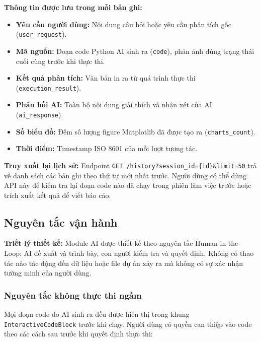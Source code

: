 \noindent\textbf{Thông tin được lưu trong mỗi bản ghi:}
\begin{itemize}
    \item \textbf{Yêu cầu người dùng:} Nội dung câu hỏi hoặc yêu cầu phân tích gốc (\texttt{user\_request}).
    \item \textbf{Mã nguồn:} Đoạn code Python AI sinh ra (\texttt{code}), phản ánh đúng trạng thái cuối cùng trước khi thực thi.
    \item \textbf{Kết quả phân tích:} Văn bản in ra từ quá trình thực thi (\texttt{execution\_result}).
    \item \textbf{Phản hồi AI:} Toàn bộ nội dung giải thích và nhận xét của AI (\texttt{ai\_response}).
    \item \textbf{Số biểu đồ:} Đếm số lượng figure Matplotlib đã được tạo ra (\texttt{charts\_count}).
    \item \textbf{Thời điểm:} Timestamp ISO 8601 của mỗi lượt tương tác.
\end{itemize}

\noindent\textbf{Truy xuất lại lịch sử:}
Endpoint \texttt{GET /history?session\_id=\{id\}\&limit=50} trả về danh sách các bản ghi theo thứ tự mới nhất trước. Người dùng có thể dùng API này để kiểm tra lại đoạn code nào đã chạy trong phiên làm việc trước hoặc trích xuất kết quả để viết báo cáo.

\subsection{Nguyên tắc vận hành}
\label{subsec:ai_hitl}

\noindent\textbf{Triết lý thiết kế:}
Module AI được thiết kế theo nguyên tắc Human-in-the-Loop: AI đề xuất và trình bày, con người kiểm tra và quyết định. Không có thao tác nào tác động đến dữ liệu hoặc file dự án xảy ra mà không có sự xác nhận tường minh của người dùng.

\subsubsection{Nguyên tắc không thực thi ngầm}
\label{subsubsec:no_auto_exec}

Mọi đoạn code do AI sinh ra đều được hiển thị trong khung \texttt{InteractiveCodeBlock} trước khi chạy. Người dùng có quyền can thiệp vào code theo các cách sau trước khi quyết định thực thi:


